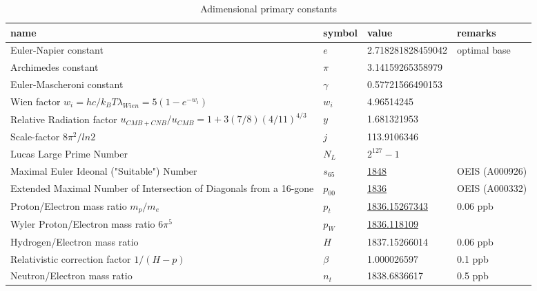 \documentclass[a4paper,9pt]{article}
\newcounter{col}
\begin{document}
\begin{table}
\caption[Table \ref{tab:2:table2}: Adimensional primary constants.]{Adimensional primary constants}
\label{tab:2:table2}
  \hskip-2.0cm\begin{tabular}{llll}
    \toprule
    \cmidrule(r){1-4}
    name & symbol    & value & remarks \\
    \midrule
    
    Euler-Napier constant  & $e$    & 2.718281828459042 & optimal base \\    
    Archimedes constant & $\pi$    & 3.14159265358979 & \\    
    Euler-Mascheroni constant & $\gamma$    & 0.57721566490153 & \\    
    Wien factor $ w_i = hc/k_BT \lambda_{Wien} = 5(1-e^{-w_i})$ &  $w_i$  & 4.96514245  &  \\
    
    Relative Radiation factor $ u_{CMB + CNB}/u_{CMB} = 1 + 3 (7/8) (4/11)^{4/3}$ &  $y$  & 1.681321953  &  \\
    
    Scale-factor $8\pi^2/ln2$  & $j$ & 113.9106346  & \cite{Sanchez2} \\
    
    Lucas Large Prime Number & $N_L$    & $2^{127}-1$  & \cite{Bastin}  \\
    
    
    Maximal Euler Ideonal ("Suitable") Number  & $s_{65}$   & \underline {1848} & OEIS (A000926) \\
    
    
    Extended Maximal Number of Intersection of Diagonals from a 16-gone & $p_{00}$   & \underline {1836} & OEIS (A000332) \\
          
    Proton/Electron mass ratio $m_p/m_e$ & $p_t$   & \underline {1836.15267343}  & 0.06 ppb \\ 
    Wyler Proton/Electron mass ratio $6\pi^5$ & $p_W$   & \underline {1836.118109}  & \cite{Wyler} \\ 
    Hydrogen/Electron mass ratio  & $H$  & 1837.15266014  & 0.06 ppb \\
    Relativistic correction factor $1/(H-p)$ & $\beta$  & 1.000026597  & 0.1 ppb\\
    Neutron/Electron mass ratio  & $n_t$ & 1838.6836617  & 0.5 ppb \\     
    

\end{tabular}
\end{table}
\end{document}
